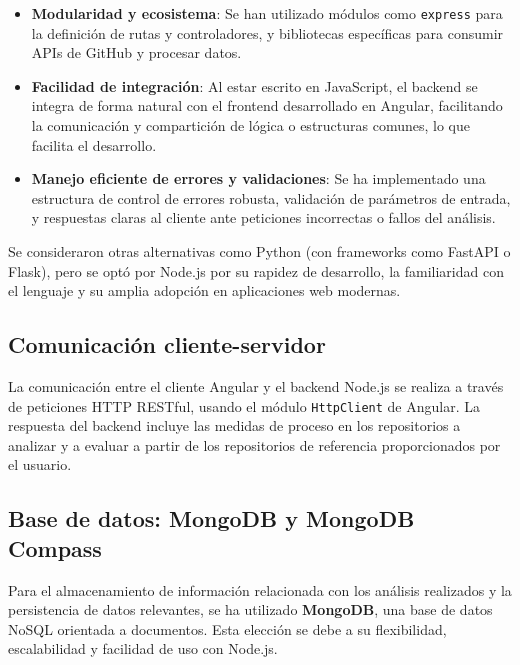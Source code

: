 \begin{itemize}  
  \item \textbf{Modularidad y ecosistema}: Se han utilizado módulos como \texttt{express} para la definición de rutas y controladores, y bibliotecas específicas para consumir APIs de GitHub y procesar datos.
  
  \item \textbf{Facilidad de integración}: Al estar escrito en JavaScript, el backend se integra de forma natural con el frontend desarrollado en Angular, facilitando la comunicación y compartición de lógica o estructuras comunes, lo que facilita el desarrollo.
  
  \item \textbf{Manejo eficiente de errores y validaciones}: Se ha implementado una estructura de control de errores robusta, validación de parámetros de entrada, y respuestas claras al cliente ante peticiones incorrectas o fallos del análisis.
\end{itemize}

Se consideraron otras alternativas como Python (con frameworks como FastAPI o Flask), pero se optó por Node.js por su rapidez de desarrollo, la familiaridad con el lenguaje y su amplia adopción en aplicaciones web modernas.

\subsection{Comunicación cliente-servidor}

La comunicación entre el cliente Angular y el backend Node.js se realiza a través de peticiones HTTP RESTful, usando el módulo \texttt{HttpClient} de Angular. La respuesta del backend incluye las medidas de proceso en los repositorios a analizar y a evaluar a partir de los repositorios de referencia proporcionados por el usuario.

\subsection{Base de datos: MongoDB y MongoDB Compass}

Para el almacenamiento de información relacionada con los análisis realizados y la persistencia de datos relevantes, se ha utilizado \textbf{MongoDB}, una base de datos NoSQL orientada a documentos. Esta elección se debe a su flexibilidad, escalabilidad y facilidad de uso con Node.js.

